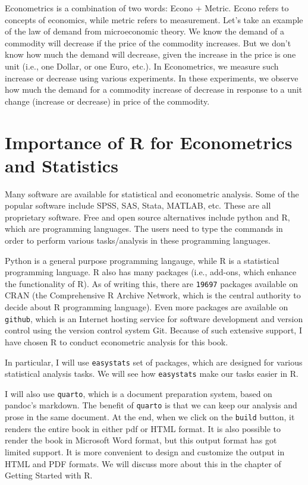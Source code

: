 \documentclass[
  letterpaper,
  paper =a4,
  twoside,
  openright,
  headsepline,
  footsepline,
  listof = totocnumbered,
  chapterprefix = true,
  firstiscover]{scrbook}
\begin{document}
Econometrics is a combination of two words: Econo + Metric. Econo refers
to concepts of economics, while metric refers to measurement. Let's take
an example of the law of demand from microeconomic theory. We know the
demand of a commodity will decrease if the price of the commodity
increases. But we don't know how much the demand will decrease, given
the increase in the price is one unit (i.e., one Dollar, or one Euro,
etc.). In Econometrics, we measure such increase or decrease using
various experiments. In these experiments, we observe how much the
demand for a commodity increase of decrease in response to a unit change
(increase or decrease) in price of the commodity.

\hypertarget{importance-of-r-for-econometrics-and-statistics}{%
\section{Importance of R for Econometrics and
Statistics}\label{importance-of-r-for-econometrics-and-statistics}}

Many software are available for statistical and econometric analysis.
Some of the popular software include SPSS, SAS, Stata, MATLAB, etc.
These are all proprietary software. Free and open source alternatives
include python and R, which are programming languages. The users need to
type the commands in order to perform various tasks/analysis in these
programming languages.

Python is a general purpose programming langauge, while R is a
statistical programming language. R also has many packages (i.e.,
add-ons, which enhance the functionality of R). As of writing this,
there are \texttt{19697} packages available on CRAN (the Comprehensive R
Archive Network, which is the central authority to decide about R
programming language). Even more packages are available on
\texttt{github}, which is an Internet hosting service for software
development and version control using the version control system Git.
Because of such extensive support, I have chosen R to conduct
econometric analysis for this book.

In particular, I will use \texttt{easystats} set of packages, which are
designed for various statistical analysis tasks. We will see how
\texttt{easystats} make our tasks easier in R.

I will also use \texttt{quarto}, which is a document preparation system,
based on pandoc's markdown. The benefit of \texttt{quarto} is that we
can keep our analysis and prose in the same document. At the end, when
we click on the \texttt{build} button, it renders the entire book in
either pdf or HTML format. It is also possible to render the book in
Microsoft Word format, but this output format has got limited support.
It is more convenient to design and customize the output in HTML and PDF
formats. We will discuss more about this in the chapter of Getting
Started with R.
\end{document}
